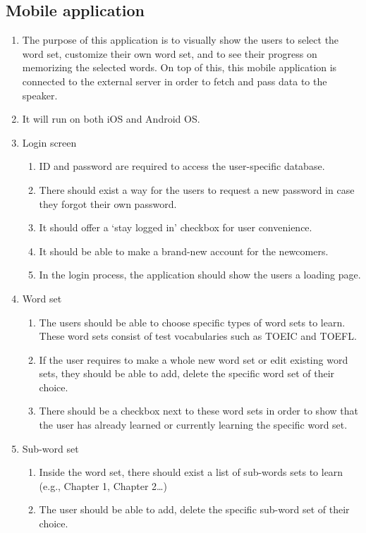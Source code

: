 \documentclass[conference]{IEEEtran}
\begin{document}
\subsection{Mobile application}

\begin{enumerate}
\item The purpose of this application is to visually show the users to select the word set, customize their own word set, and to see their progress on memorizing the selected words. On top of this, this mobile application is connected to the external server in order to fetch and pass data to the speaker.
\item It will run on both iOS and Android OS.
\item Login screen
    \begin{enumerate}
    \item ID and password are required to access the user-specific database.
    \item There should exist a way for the users to request a new password in case they forgot their own password.
    \item It should offer a ‘stay logged in’ checkbox for user convenience.
    \item It should be able to make a brand-new account for the newcomers.
    \item In the login process, the application should show the users a loading page.
    \end{enumerate}
\item Word set
    \begin{enumerate}
    \item The users should be able to choose specific types of word sets to learn. These word sets consist of test vocabularies such as TOEIC and TOEFL.
    \item If the user requires to make a whole new word set or edit existing word sets, they should be able to add, delete the specific word set of their choice.
    \item There should be a checkbox next to these word sets in order to show that the user has already learned or currently learning the specific word set.
    \end{enumerate}
\item Sub-word set
    \begin{enumerate}
    \item Inside the word set, there should exist a list of sub-words sets to learn (e.g., Chapter 1, Chapter 2…)
    \item The user should be able to add, delete the specific sub-word set of their choice.

\end{enumerate}
\end{enumerate}
\end{document}
